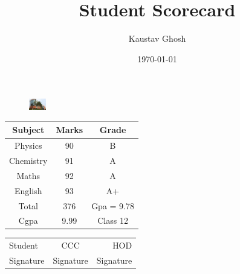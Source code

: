 \documentclass[a4paper,12pt]{article}
\begin{document}
	\title{Student Scorecard}
	\author{Kaustav Ghosh}
	\date{\today}
	\maketitle
	
	
	\begin{figure}[t!]
		\flushright
		\includegraphics[height=0.5cm]{manipal.jpg}
	\end{figure}
	
	\begin{table}[ht!]
		\centering
			\begin{tabular}{c|c|c}
			Subject & Marks & Grade\\
			\hline
			Physics & 90 & B\\
			\hline
			Chemistry & 91 & A\\
			\hline
			Maths & 92 & A\\
			\hline
			English & 93 & A+\\
			\hline
			Total & 376 & Gpa = 9.78\\
			\cline{1-2}
			Cgpa & 9.99 & Class 12\\
			\hline
			\end{tabular}
	\end{table}


	\begin{table}[b!]
		\centering
		\begin{tabular}{lcr}
		Student  & CCC  & HOD \\
		 Signature &  Signature &  Signature\\
		\hline
		\end{tabular}
	\end{table}
\end{document}
